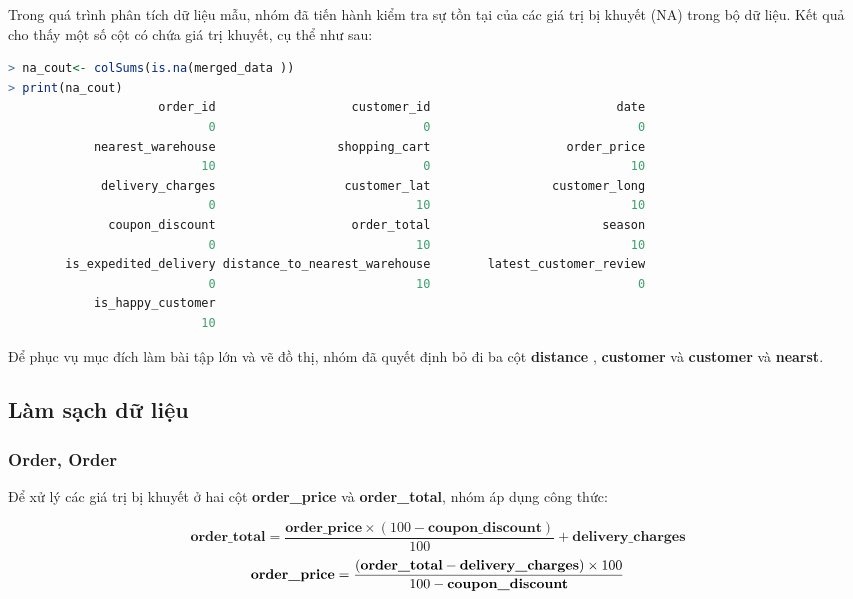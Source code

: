 Trong quá trình phân tích dữ liệu mẫu, nhóm đã tiến hành kiểm tra sự tồn tại của các giá trị bị khuyết (NA) trong bộ dữ liệu. Kết quả cho thấy một số cột có chứa giá trị khuyết, cụ thể như sau:

\begin{lstlisting}[language=r,caption={Các cột dữ liệu chứa giá trị bị khuyết}]
> na_cout<- colSums(is.na(merged_data ))
> print(na_cout)
                     order_id                   customer_id                          date 
                            0                             0                             0 
            nearest_warehouse                 shopping_cart                   order_price 
                           10                             0                            10 
             delivery_charges                  customer_lat                 customer_long 
                            0                            10                            10 
              coupon_discount                   order_total                        season 
                            0                            10                            10 
        is_expedited_delivery distance_to_nearest_warehouse        latest_customer_review 
                            0                            10                             0 
            is_happy_customer 
                           10 
\end{lstlisting}
\begin{boxH}
    Để phục vụ mục đích làm bài tập lớn và vẽ đồ thị, nhóm đã quyết định bỏ đi ba cột \textbf{distance} , \textbf{customer} và \textbf{customer} và \textbf{nearst}.
\end{boxH}
\subsection{Làm sạch dữ liệu}
\subsubsection{Order, Order}
Để xử lý các giá trị bị khuyết ở hai cột \textbf{order\_price} và \textbf{order\_total}, nhóm áp dụng công thức:

\begin{equation}
\textbf{order\_total} = \frac{\textbf{order\_price} \times (100 - \textbf{coupon\_discount})}{100} + \textbf{delivery\_charges}
\end{equation}
\noindent
\begin{equation}
\noindent
\textbf{order\_price} = \frac{(\textbf{order\_total} - \textbf{delivery\_charges}) \times 100}{100 - \textbf{coupon\_discount}}
\end{equation}



